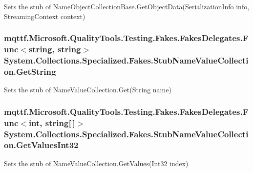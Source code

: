 Sets the stub of Name\-Object\-Collection\-Base.\-Get\-Object\-Data(\-Serialization\-Info info, Streaming\-Context context)

\hypertarget{class_system_1_1_collections_1_1_specialized_1_1_fakes_1_1_stub_name_value_collection_aed7503fcf44c8c1a23a69ad288329049}{
\subsubsection[{Get\-String}]{\setlength{\rightskip}{0pt plus 5cm}mqttf.\-Microsoft.\-Quality\-Tools.\-Testing.\-Fakes.\-Fakes\-Delegates.\-Func$<$string, string$>$ System.\-Collections.\-Specialized.\-Fakes.\-Stub\-Name\-Value\-Collection.\-Get\-String}}\label{class_system_1_1_collections_1_1_specialized_1_1_fakes_1_1_stub_name_value_collection_aed7503fcf44c8c1a23a69ad288329049}


Sets the stub of Name\-Value\-Collection.\-Get(\-String name)

\hypertarget{class_system_1_1_collections_1_1_specialized_1_1_fakes_1_1_stub_name_value_collection_a7e2a7ab6e0300a44fbee27be4b48809b}{
\subsubsection[{Get\-Values\-Int32}]{\setlength{\rightskip}{0pt plus 5cm}mqttf.\-Microsoft.\-Quality\-Tools.\-Testing.\-Fakes.\-Fakes\-Delegates.\-Func$<$int, string\mbox{[}$\,$\mbox{]}$>$ System.\-Collections.\-Specialized.\-Fakes.\-Stub\-Name\-Value\-Collection.\-Get\-Values\-Int32}}\label{class_system_1_1_collections_1_1_specialized_1_1_fakes_1_1_stub_name_value_collection_a7e2a7ab6e0300a44fbee27be4b48809b}


Sets the stub of Name\-Value\-Collection.\-Get\-Values(\-Int32 index)

